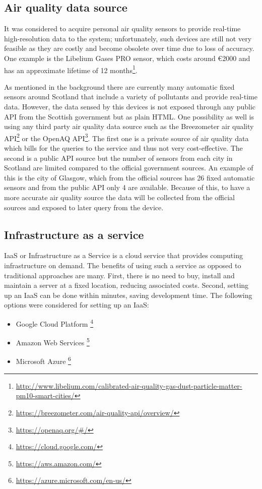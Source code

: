 \subsection{Air quality data source}
It was considered to acquire personal air quality sensors to provide real-time high-resolution data to the system; unfortunately, such devices are still not very feasible as they are costly and become obsolete over time due to loss of accuracy. One example is the Libelium Gases PRO sensor, which costs around \euro{}2000 and has an approximate lifetime of 12 months\footnote{\url{http://www.libelium.com/calibrated-air-quality-gas-dust-particle-matter-pm10-smart-cities/}}. 

As mentioned in the background there are currently many automatic fixed sensors around Scotland that include a variety of pollutants and provide real-time data. However, the data sensed by this devices is not exposed through any public API from the Scottish government but as plain HTML. One possibility as well is using any third party air quality data source such as the Breezometer air quality API\footnote{\url{https://breezometer.com/air-quality-api/overview/}} or the OpenAQ API\footnote{\url{https://openaq.org/#/}}. The first one is a private source of air quality data which bills for the queries to the service and thus not very cost-effective. The second is a public API source but the number of sensors from each city in Scotland are limited compared to the official government sources. An example of this is the city of Glasgow, which from the official sources has 26 fixed automatic sensors and from the public API only 4 are available. Because of this, to have a more accurate air quality source the data will be collected from the official sources and exposed to later query from the device. 


\subsection{Infrastructure as a service}

IaaS or Infrastructure as a Service is a cloud service that provides computing infrastructure on demand. The benefits of using such a service as opposed to traditional approaches are many. First, there is no need to buy, install and maintain a server at a fixed location, reducing associated costs. Second, setting up an IaaS can be done within minutes, saving  development time. The following options were considered for setting up an IaaS: 

\begin{itemize}
	\item Google Cloud Platform \footnote{\url{https://cloud.google.com/}}
    \item Amazon Web Services \footnote{\url{https://aws.amazon.com/}}
    \item Microsoft Azure \footnote{\url{https://azure.microsoft.com/en-us/}}
\end{itemize}

